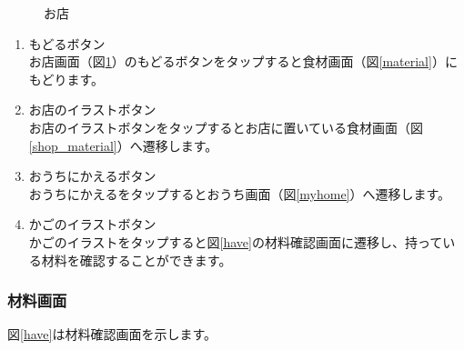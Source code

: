 \documentclass[a4j]{jarticle}
\begin{document}
\begin{figure}[H]
    \begin{center}
    \caption {お店}
    \label{shop}
    \end{center}
\end{figure}

\begin{enumerate}
  \renewcommand{\labelenumi}{\textcircled{\scriptsize \theenumi}}
\item もどるボタン\\
  お店画面（図\ref{shop}）のもどるボタンをタップすると食材画面（図\ref{material}）にもどります。
\item お店のイラストボタン\\
  お店のイラストボタンをタップするとお店に置いている食材画面（図\ref{shop_material}）へ遷移します。
\item おうちにかえるボタン\\
  おうちにかえるをタップするとおうち画面（図\ref{myhome}）へ遷移します。
\item かごのイラストボタン\\
  かごのイラストをタップすると図\ref{have}の材料確認画面に遷移し、持っている材料を確認することができます。
\end{enumerate}

\newpage
\subsubsection{材料画面}
図\ref{have}は材料確認画面を示します。\\
\end{document}
